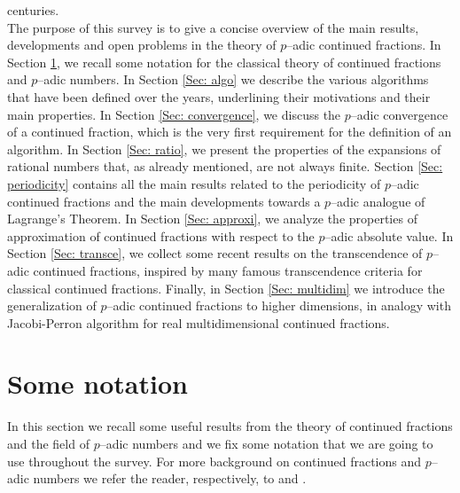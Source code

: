 \documentclass[12pt, reqno]{amsart}
\theoremstyle{plain}
\theoremstyle{definition}
\begin{document}
centuries. \\

The purpose of this survey is to give a concise overview of the main results, developments and open problems in the theory of $p$--adic continued fractions. In Section \ref{Sec: preli}, we recall some notation for the classical theory of continued fractions and $p$--adic numbers. In Section \ref{Sec: algo} we describe the various algorithms that have been defined over the years, underlining their motivations and their main properties. In Section \ref{Sec: convergence}, we discuss the $p$--adic convergence of a continued fraction, which is the very first requirement for the definition of an algorithm. In Section \ref{Sec: ratio}, we present the properties of the expansions of rational numbers that, as already mentioned, are not always finite. Section \ref{Sec: periodicity} contains all the main results related to the periodicity of $p$--adic continued fractions and the main developments towards a $p$--adic analogue of Lagrange's Theorem. In Section \ref{Sec: approxi}, we analyze the properties of approximation of continued fractions with respect to the $p$--adic absolute value. In Section \ref{Sec: transce}, we collect some recent results on the transcendence of $p$--adic continued fractions, inspired by many famous transcendence criteria for classical continued fractions. Finally, in Section \ref{Sec: multidim} we introduce the generalization of $p$--adic continued fractions to higher dimensions, in analogy with Jacobi-Perron algorithm for real multidimensional continued fractions.

\section{Some notation}\label{Sec: preli}
In this section we recall some useful results from the theory of continued fractions and the field of $p$--adic numbers and we fix some notation that we are going to use throughout the survey. For more background on continued fractions and $p$--adic numbers we refer the reader, respectively, to \cite{OLDS, WALL} and \cite{FG}.\\
\end{document}
